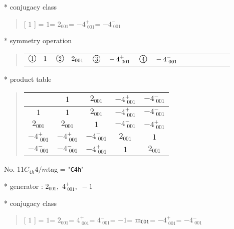 \documentclass[fleqn,10pt,landscape]{jsarticle}
\begin{document}
* conjugacy class
\begin{quote}
[ $1$ ] = \quad $1$\newline[ $2{}_{001}$ ] = \quad $2{}_{001}$\newline[ $-4^{+}_{\,\,001}$ ] = \quad $-4^{+}_{\,\,001}$\newline[ $-4^{-}_{\,\,001}$ ] = \quad $-4^{-}_{\,\,001}$\newline
\end{quote}

* symmetry operation
\begin{quote}
\begin{tabular}{llllllllll}
$ {\ooalign{\hfil\resizebox{.8\width}{\height}{1}\hfil\crcr\raise.1ex\hbox{\large$\bigcirc$}}}\quad 1 $ & $ {\ooalign{\hfil\resizebox{.8\width}{\height}{2}\hfil\crcr\raise.1ex\hbox{\large$\bigcirc$}}}\quad 2{}_{001} $ & $ {\ooalign{\hfil\resizebox{.8\width}{\height}{3}\hfil\crcr\raise.1ex\hbox{\large$\bigcirc$}}}\quad -4^{+}_{\,\,001} $ & $ {\ooalign{\hfil\resizebox{.8\width}{\height}{4}\hfil\crcr\raise.1ex\hbox{\large$\bigcirc$}}}\quad -4^{-}_{\,\,001} $
\end{tabular}
\end{quote}

* product table
\begin{quote}
\begin{tabular}{ccccc} \hline \hline
 & $ 1 $ & $ 2{}_{001} $ & $ -4^{+}_{\,\,001} $ & $ -4^{-}_{\,\,001} $ \\ \hline
$ 1 $ & $ 1 $ & $ 2{}_{001} $ & $ -4^{+}_{\,\,001} $ & $ -4^{-}_{\,\,001} $ \\
$ 2{}_{001} $ & $ 2{}_{001} $ & $ 1 $ & $ -4^{-}_{\,\,001} $ & $ -4^{+}_{\,\,001} $ \\
$ -4^{+}_{\,\,001} $ & $ -4^{+}_{\,\,001} $ & $ -4^{-}_{\,\,001} $ & $ 2{}_{001} $ & $ 1 $ \\
$ -4^{-}_{\,\,001} $ & $ -4^{-}_{\,\,001} $ & $ -4^{+}_{\,\,001} $ & $ 1 $ & $ 2{}_{001} $ \\
 \hline \hline
\end{tabular}
\end{quote}

\newpage

No. 11\quad$C_{4h}$\quad$4/m$\quad[ tetragonal ]
tag = "{\tt C4h}"

* generator : $2{}_{001},\,\,4^{+}_{\,\,001},\,\,-1$

* conjugacy class
\begin{quote}
[ $1$ ] = \quad $1$\newline[ $2{}_{001}$ ] = \quad $2{}_{001}$\newline[ $4^{+}_{\,\,001}$ ] = \quad $4^{+}_{\,\,001}$\newline[ $4^{-}_{\,\,001}$ ] = \quad $4^{-}_{\,\,001}$\newline[ $-1$ ] = \quad $-1$\newline[ ${\rm m}_{001}$ ] = \quad ${\rm m}_{001}$\newline[ $-4^{+}_{\,\,001}$ ] = \quad $-4^{+}_{\,\,001}$\newline[ $-4^{-}_{\,\,001}$ ] = \quad $-4^{-}_{\,\,001}$\newline
\end{quote}
\end{document}
